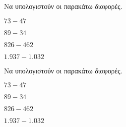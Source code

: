 Να υπολογιστούν οι παρακάτω διαφορές.
\begin{multicols}{2}
\begin{rlist}
\item $ 73-47 $
\item $ 89-34 $
\item $ 826-462 $
\item $ 1.937-1.032 $
\end{rlist}
\end{multicols}
Να υπολογιστούν οι παρακάτω διαφορές.
\begin{multicols}{2}
\begin{rlist}
\item $ 73-47 $
\item $ 89-34 $
\item $ 826-462 $
\item $ 1.937-1.032 $
\end{rlist}
\end{multicols}
